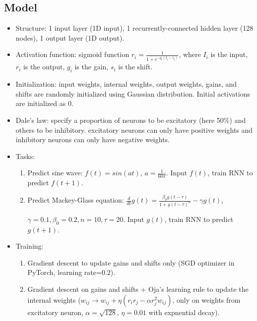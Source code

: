 \documentclass[12pt, a4paper]{article}
\begin{document}
\subsection*{Model}
\begin{itemize}
    \item Structure: 1 input layer (1D input), 1 recurrently-connected hidden layer (128 nodes), 1 output layer (1D output).
    \item Activation function: sigmoid function $r_i = \frac{1}{1 + e^{-g_i(I_i-s_i)}}$, where $I_i$ is the input, $r_i$ is the output, $g_i$ is the gain, $s_i$ is the shift. 
    \item Initialization: input weights, internal weights, output weights, gains, and shifts are randomly initialized using Gaussian distribution. Initial activations are initialized as 0.
    \item Dale's law: specify a proportion of neurons to be excitatory (here 50\%) and others to be inhibitory. excitatory neurons can only have positive weights and inhibitory neurons can only have negative weights.
    \item Tasks:
    \begin{enumerate}
        \item Predict sine wave: $f(t)=sin(at)$, $a=\frac{1}{60\pi}$. Input $f(t)$, train RNN to predict $f(t+1)$.
        \item Predict Mackey-Glass equation: $\frac{d}{dt}g(t)=\frac{\beta_0 g(t-\tau)}{1+g(t-\tau)^n}-\gamma g(t)$, 
        
        $\gamma=0.1, \beta_0=0.2, n=10, \tau=20$. Input $g(t)$, train RNN to predict $g(t+1)$.
    \end{enumerate}
    \item Training: 
    \begin{enumerate}
        \item Gradient descent to update gains and shifts only (SGD optimizer in PyTorch, learning rate=$0.2$).
        \item Gradient descent on gains and shifts + Oja's learning rule to update the internal weights ($w_{ij} \rightarrow w_{ij} + \eta (r_i r_j - \alpha r_j^2 w_{ij})$, only on weights from excitatory neuron, $\alpha = \sqrt{128}$, $\eta=0.01$ with expnential decay).
    \end{enumerate}


\end{itemize}
\end{document}
